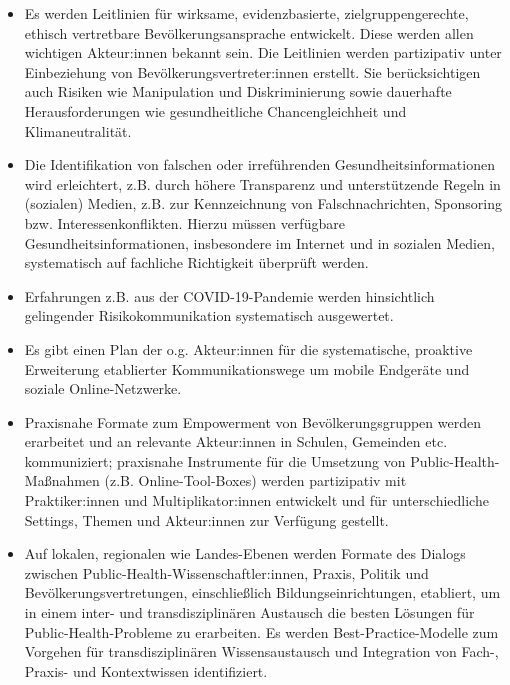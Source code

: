 \documentclass{article}
\begin{document}
\begin{itemize}
\item Es werden Leitlinien für wirksame, evidenzbasierte, zielgruppengerechte, ethisch vertretbare Bevölkerungsansprache entwickelt. Diese werden allen wichtigen Akteur:innen bekannt sein. Die Leitlinien werden partizipativ unter Einbeziehung von Bevölkerungsvertreter:innen erstellt. Sie berücksichtigen auch Risiken wie Manipulation und Diskriminierung sowie dauerhafte Herausforderungen wie gesundheitliche Chancengleichheit und Klimaneutralität.


\item Die Identifikation von falschen oder irreführenden Gesundheitsinformationen wird erleichtert, z.B. durch höhere Transparenz und unterstützende Regeln in (sozialen) Medien, z.B. zur Kennzeichnung von Falschnachrichten, Sponsoring bzw. Interessenkonflikten. Hierzu müssen verfügbare Gesundheitsinformationen, insbesondere im Internet und in sozialen Medien, systematisch auf fachliche Richtigkeit überprüft werden.


\item Erfahrungen z.B. aus der COVID-19-Pandemie werden hinsichtlich gelingender Risikokommunikation systematisch ausgewertet.


\item Es gibt einen Plan der o.g. Akteur:innen für die systematische, proaktive Erweiterung etablierter Kommunikationswege um mobile Endgeräte und soziale Online-Netzwerke. 


\item Praxisnahe Formate zum Empowerment von Bevölkerungsgruppen werden erarbeitet und an relevante Akteur:innen in Schulen, Gemeinden etc. kommuniziert; praxisnahe Instrumente für die Umsetzung von Public-Health-Maßnahmen (z.B. Online-Tool-Boxes) werden partizipativ mit Praktiker:innen und Multiplikator:innen entwickelt und für unterschiedliche Settings, Themen und Akteur:innen zur Verfügung gestellt.


\item Auf lokalen, regionalen wie Landes-Ebenen werden Formate des Dialogs zwischen Public-Health-Wissenschaftler:innen, Praxis, Politik und Bevölkerungsvertretungen, einschließlich Bildungseinrichtungen, etabliert, um in einem inter- und transdisziplinären Austausch die besten Lösungen für Public-Health-Probleme zu erarbeiten. Es werden Best-Practice-Modelle zum Vorgehen für transdisziplinären Wissensaustausch und Integration von Fach-, Praxis- und Kontextwissen identifiziert.



\end{itemize}
\end{document}
